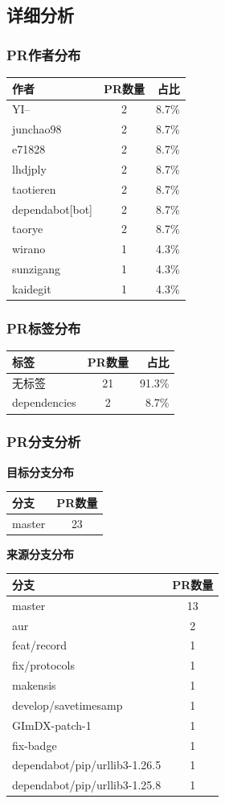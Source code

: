 \subsection*{详细分析}

\subsubsection*{PR作者分布}
\begin{longtable}{l|c|r}
\hline
\textbf{作者} & \textbf{PR数量} & \textbf{占比} \\
\hline
YI-- & 2 & 8.7\% \\
junchao98 & 2 & 8.7\% \\
e71828 & 2 & 8.7\% \\
lhdjply & 2 & 8.7\% \\
taotieren & 2 & 8.7\% \\
dependabot[bot] & 2 & 8.7\% \\
taorye & 2 & 8.7\% \\
wirano & 1 & 4.3\% \\
sunzigang & 1 & 4.3\% \\
kaidegit & 1 & 4.3\% \\
\hline
\end{longtable}

\subsubsection*{PR标签分布}
\begin{longtable}{l|c|r}
\hline
\textbf{标签} & \textbf{PR数量} & \textbf{占比} \\
\hline
无标签 & 21 & 91.3\% \\
dependencies & 2 & 8.7\% \\
\hline
\end{longtable}

\subsubsection*{PR分支分析}

\textbf{目标分支分布}
\begin{longtable}{l|c}
\hline
\textbf{分支} & \textbf{PR数量} \\
\hline
master & 23 \\
\hline
\end{longtable}

\textbf{来源分支分布}
\begin{longtable}{l|c}
\hline
\textbf{分支} & \textbf{PR数量} \\
\hline
master & 13 \\
aur & 2 \\
feat/record & 1 \\
fix/protocols & 1 \\
makensis & 1 \\
develop/savetimesamp & 1 \\
GImDX-patch-1 & 1 \\
fix-badge & 1 \\
dependabot/pip/urllib3-1.26.5 & 1 \\
dependabot/pip/urllib3-1.25.8 & 1 \\
\hline
\end{longtable}

